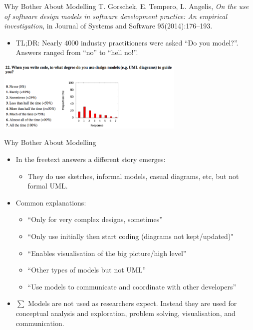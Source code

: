 \documentclass[10pt,t,a4paper]{beamer}
\begin{document}
\begin{frame}[label=sec-7]{Why Bother About Modelling}
T. Gorschek, E. Tempero, L. Angelis, \emph{On the use of software design models in software development practice: An empirical investigation}, in Journal of Systems and Software 95(2014):176--193.

\begin{itemize}
\item TL;DR: Nearly 4000 industry practitioners were asked ``Do you model?''. Answers ranged from ``no'' to ``hell no!''.
\end{itemize}
 \vspace{0.25cm}
\includegraphics[width=9cm]{./FSurveyModelling.png}
\end{frame}
\begin{frame}[label=sec-8]{Why Bother About Modelling}
\begin{itemize}
\item In the freetext answers a different story emerges:
\begin{itemize}
\item They do use sketches, informal models, casual diagrams, etc, but not formal UML.
\end{itemize}
\item Common explanations:
\begin{itemize}
\item ``Only for very complex designs, sometimes''
\item ``Only use initially then start coding (diagrams not kept/updated)"
\item ``Enables visualisation of the big picture/high level''
\item ``Other types of models but not UML''
\item ``Use models to communicate and coordinate with other developers''
\end{itemize}
\item $\sum$ Models are not used as researchers expect. Instead they are used for \alert{conceptual analysis and exploration, problem solving, visualisation, and communication.}
\end{itemize}
\end{frame}
\end{document}
